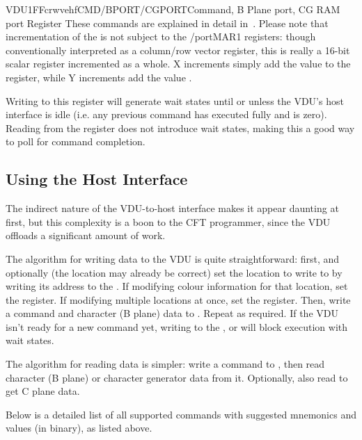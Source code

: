 \begin{ioport}{VDU}{1FF}{crwvehf}{CMD/BPORT/CGPORT}{Command, B Plane port, CG RAM port Register}
  These commands are explained in detail
  in~. Please note that incrementation of the
   is not subject to the /port{MAR1} registers: though
  conventionally interpreted as a column/row vector register, this is really a
  16-bit scalar register incremented as a whole. X increments simply add the
  value  to the register, while Y increments add the value
  .

  Writing to this register will generate wait states until or unless the VDU's
  host interface is idle (i.e. any previous command has executed fully and
   is zero). Reading from the register does not introduce wait
  states, making this a good way to poll for command completion.

\end{ioport}

\subsection{Using the Host Interface}
\label{sec:vdu:using-host-iface}

The indirect nature of the VDU-to-host interface makes it appear daunting at
first, but this complexity is a boon to the CFT programmer, since the VDU
offloads a significant amount of work.

The algorithm for writing data to the VDU is quite straightforward: first, and
optionally (the location may already be correct) set the location to write to
by writing its address to the . If modifying colour information for
that location, set the  register. If modifying multiple locations
at once, set the  register. Then, write a command and character (B
plane) data to . Repeat as required. If the VDU isn't ready for a new
command yet, writing to the ,  or  will block
execution with wait states.

The algorithm for reading data is simpler: write a command to , then
read character (B plane) or character generator data from it. Optionally, also
read  to get C plane data.

Below is a detailed list of all supported commands with suggested mnemonics and
values (in binary), as listed above.


